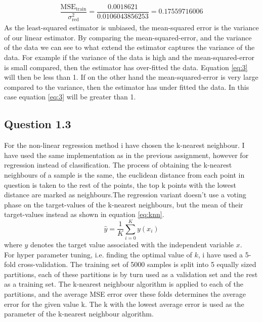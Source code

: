 \documentclass{article}
\begin{document}
\begin{align}
\dfrac{\text{MSE}_{\text{train}}}{\sigma^2_{\text{red}}} =
\dfrac{0.0018621}{0.0106043856253} = 0.17559716006
\label{eq:3}
\end{align}
As the least-squared estimator is unbiased, the mean-squared error is the variance of our linear estimator. By comparing the mean-squared-error, and the variance of the data we can see to what extend the estimator captures the variance of the data. For example if the variance of the data is high and the mean-squared-error is small compared, then the estimator has over-fitted the data. Equation \eqref{eq:3} will then be less than 1. If on the other hand the mean-squared-error is very large compared to the variance, then the estimator has under fitted the data. In this case equation \eqref{eq:3} will be greater than 1.
\subsection{Question 1.3}
For the non-linear regression method i have chosen the k-nearest neighbour. I have used the same implementation as in the previous assignment, however for regression instead of classification. The process of obtaining the k-nearest neighbours of a sample is the same, the euclidean distance from each point in question is taken to the rest of the points, the top k points with the lowest distance are marked as neighbours.The regression variant doesn't use a voting phase 
on the target-values of the k-nearest neighbours, but the mean of their target-values instead as shown in equation \eqref{eq:knn}.
\begin{equation}
\hat{y} =  \dfrac{1}{K} \sum\limits_{i=0}^K y(x_i)
\label{eq:knn}
\end{equation}
where $y$ denotes the target value associated with the independent variable $x$. \\
For hyper parameter tuning, i.e. finding the optimal value of $k$, i have used a 5-fold cross-validation. The training set of 5000 samples is split into 5 equally sized partitions, each of these partitions is by turn used as a validation set and the rest as a training set. The k-nearest neighbour algorithm is applied to each of the partitions, and the average MSE error over these folds determines the average error for the given value k. The k with the lowest average error is used as the parameter of the k-nearest neighbour algorithm.
\\
\end{document}
